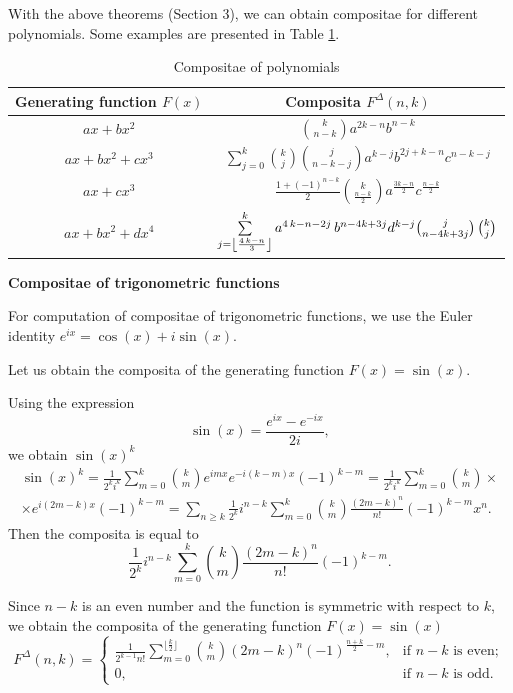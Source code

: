 \documentclass[12pt]{article}
\begin{document}
With the above theorems (Section 3), we can obtain compositae for different polynomials. Some examples are presented in Table \ref{Tabl2_compositae}.

\begin{table}[h]
\begin{center}
\setlength\arrayrulewidth{1pt}
\renewcommand{\arraystretch}{1,3}
\begin{tabular}{|c|c|}
\hline
\textbf{Generating function $F(x)$}&  \textbf{Composita $F^{\Delta}(n,k)$}\\
\hline
$ax+bx^2$ & ${k \choose n-k} a^{2k-n}b^{n-k}$\\ \hline
$ax+bx^2+cx^3$ &$\sum\limits_{j=0}^k{k\choose j}{j \choose n-k-j}a^{k-j}b^{2j+k-n}c^{n-k-j}$\\  \hline
$ax+cx^3$ &$\frac{1+(-1)^{n-k}}{2}{k \choose \frac{n-k}{2}}a^\frac{3k-n}{2}c^\frac{n-k}{2}$ \\  \hline
$ax+bx^2+dx^4$ & $\sum\limits_{j=\left \lfloor {{4\,k-n}\over{3}} \right \rfloor}^{k}{a^{4\,k-n-2j}\,b^{n-4k+3j}d^{k-j}{{j}\choose{n-4k+3j}}\,{{k
 }\choose{j}}}$ \\ \hline
\end{tabular}
\caption{Compositae of polynomials}
\label{Tabl2_compositae}
\end{center}
\end{table}

\textbf{Compositae of trigonometric functions}

For computation of compositae of trigonometric functions, we use the Euler identity $e^{ix}=\cos(x)+i\sin(x)$.

Let us obtain the composita of the generating function $F(x)=\sin(x)$. 

Using the expression
$$
\sin(x)=\frac{e^{ix}-e^{-ix}}{2i},
$$
we obtain $\sin(x)^k$
\begin{multline*}
\sin(x)^k=\frac{1}{2^ki^k}\sum_{m=0}^k {k \choose m} e^{imx}e^{-i(k-m)x}(-1)^{k-m}=\frac{1}{2^ki^k}\sum_{m=0}^k {k \choose m}\times \\ \times e^{i(2m-k)x}(-1)^{k-m}=\sum_{n\geq k}\frac{1}{2^k}i^{n-k}\sum_{m=0}^k {k \choose m} \frac{(2m-k)^n}{n!}(-1)^{k-m}x^n.
\end{multline*}
Then the composita is equal to
$$
\frac{1}{2^k}i^{n-k}\sum_{m=0}^k {k \choose m} \frac{(2m-k)^n}{n!}(-1)^{k-m}.
$$

Since $n-k$ is an even number and the function is symmetric with respect to $k$, we obtain the composita of the generating function $F(x)=\sin (x)$
\begin{equation}
F^{\Delta}(n,k)=\begin{cases}
\frac{1}{2^{k-1}n!}\sum_{m=0}^{\lfloor \frac{k}{2} \rfloor} {k \choose m} (2m-k)^n(-1)^{\frac{n+k}{2}-m}, & \text{if $n-k$ is even};\\
0, & \text{if $n-k$ is odd}.
\end{cases}
\end{equation}
\end{document}
